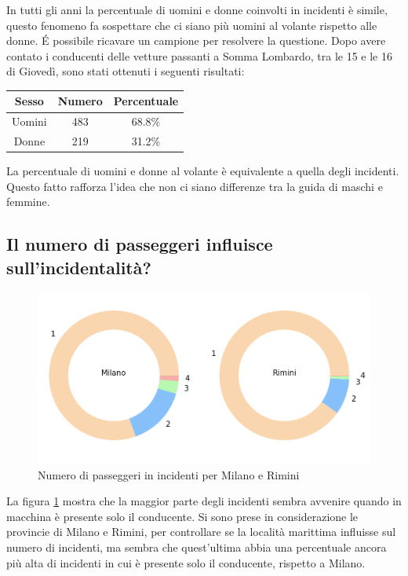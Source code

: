 \documentclass[a4paper]{report}
\begin{document}
In tutti gli anni la percentuale di uomini e donne coinvolti in incidenti è simile, 
questo fenomeno fa sospettare che ci siano più uomini al volante rispetto alle donne.
\'E possibile ricavare un campione per resolvere la questione. 
Dopo avere contato i conducenti delle vetture passanti a Somma Lombardo, tra le 15 e le 16 
di Giovedì, sono stati ottenuti i seguenti risultati:

\begin{center}
    \def\arraystretch{1.5}%
    \begin{tabular}{ |c|c|c| }
        \hline
        Sesso & Numero & Percentuale \\ 
        \hline
        \rowcolor{TableGray}
        Uomini & 483 & 68.8\% \\
        Donne & 219 & 31.2\% \\
        \hline
    \end{tabular}
\end{center}

La percentuale di uomini e donne al volante è equivalente a quella degli incidenti.
Questo fatto rafforza l'idea che non ci siano differenze tra la guida di maschi e femmine.


\subsection{Il numero di passeggeri influisce sull'incidentalità?}

\begin{figure}
    \includegraphics[width=\linewidth]{../src/incidenti/incidenti_senza_coords/tipo_veicoli/passeggeri.png}
    \caption{Numero di passeggeri in incidenti per Milano e Rimini}
    \label{fig:passeggeri-milano-rimini}
\end{figure}

La figura \ref{fig:passeggeri-milano-rimini} mostra che la maggior parte degli incidenti 
sembra avvenire quando in macchina è presente solo il conducente.
Si sono prese in considerazione le provincie di Milano e Rimini, per controllare se la località 
marittima influisse sul numero di incidenti, ma sembra che quest'ultima abbia una percentuale 
ancora più alta di incidenti in cui è presente solo il conducente, rispetto a Milano.
\end{document}
